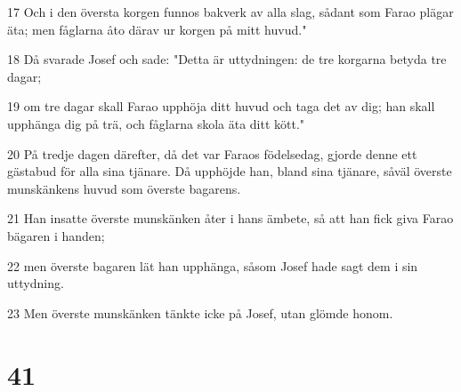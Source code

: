 \par 17 Och i den översta korgen funnos bakverk av alla slag, sådant som Farao plägar äta; men fåglarna åto därav ur korgen på mitt huvud."
\par 18 Då svarade Josef och sade: "Detta är uttydningen: de tre korgarna betyda tre dagar;
\par 19 om tre dagar skall Farao upphöja ditt huvud och taga det av dig; han skall upphänga dig på trä, och fåglarna skola äta ditt kött."
\par 20 På tredje dagen därefter, då det var Faraos födelsedag, gjorde denne ett gästabud för alla sina tjänare. Då upphöjde han, bland sina tjänare, såväl överste munskänkens huvud som överste bagarens.
\par 21 Han insatte överste munskänken åter i hans ämbete, så att han fick giva Farao bägaren i handen;
\par 22 men överste bagaren lät han upphänga, såsom Josef hade sagt dem i sin uttydning.
\par 23 Men överste munskänken tänkte icke på Josef, utan glömde honom.

\chapter{41}

